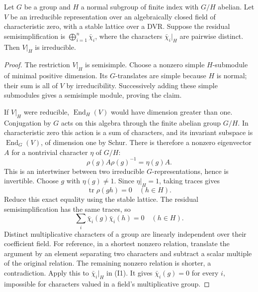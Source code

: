 \begin{srlemma}\label{lem:sr-residual-distinct-abelian-restriction}
Let \(G\) be a group and \(H\) a normal subgroup of finite
index with \(G/H\) abelian.
Let \(V\) be an irreducible representation over an
algebraically closed field of characteristic zero,
with a stable lattice over a DVR.
Suppose the residual semisimplification is
\(\bigoplus_{i=1}^n\bar\chi_i\), where
the characters \(\bar\chi_i|_H\) are pairwise distinct.
Then \(V|_H\) is irreducible.
\end{srlemma}
\begin{proof}
The restriction \(V|_H\) is semisimple.
Choose a nonzero simple \(H\)-submodule of minimal
positive dimension.
Its \(G\)-translates are simple because \(H\) is normal;
their sum is all of \(V\) by irreducibility.
Successively adding these simple submodules gives a
semisimple module, proving the claim.

If \(V|_H\) were reducible,
\(\operatorname{End}_H(V)\) would have dimension greater
than one.
Conjugation by \(G\) acts on this algebra through the
finite abelian group \(G/H\).
In characteristic zero this action is a sum of characters,
and its invariant subspace is
\(\operatorname{End}_G(V)\), of dimension one by Schur.
There is therefore a nonzero eigenvector \(A\) for a
nontrivial character \(\eta\) of \(G/H\):
\[
                    \rho(g)A\rho(g)^{-1}=\eta(g)A .
\]
This is an intertwiner between two irreducible
\(G\)-representations, hence is invertible.
Choose \(g\) with \(\eta(g)\ne1\).
Since \(\eta|_H=1\), taking traces gives
\[
                      \operatorname{tr}\rho(gh)=0
                                     \quad(h\in H).
\]
Reduce this exact equality using the stable lattice.
The residual semisimplification has the same traces,
so
\[
              \sum_i\bar\chi_i(g)\bar\chi_i(h)=0
                                      \quad(h\in H).
 \tag{I1}
\]
Distinct multiplicative characters of a group are
linearly independent over their coefficient field.
For reference, in a shortest nonzero relation, translate
the argument by an element separating two characters
and subtract a scalar multiple of the original relation.
The remaining nonzero relation is shorter, a contradiction.
Apply this to \(\bar\chi_i|_H\) in (I1).
It gives \(\bar\chi_i(g)=0\) for every \(i\), impossible
for characters valued in a field's multiplicative group.
\end{proof}

